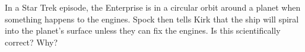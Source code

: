 In a Star Trek episode, the Enterprise is in a circular
orbit around a planet when something happens to the engines.
Spock then tells Kirk that the ship will spiral into the
planet's surface unless they can fix the engines. Is this
scientifically correct? Why?
